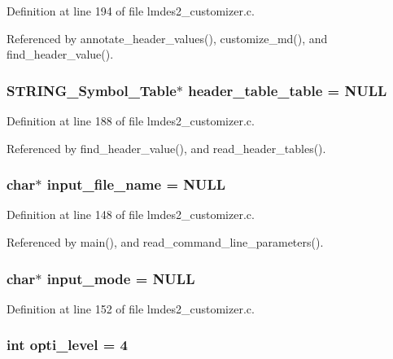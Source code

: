Definition at line 194 of file lmdes2\_\-customizer.c.

Referenced by annotate\_\-header\_\-values(), customize\_\-md(), and find\_\-header\_\-value().
\subsubsection{\setlength{\rightskip}{0pt plus 5cm}\bf{STRING\_\-Symbol\_\-Table}$\ast$ \bf{header\_\-table\_\-table} = \bf{NULL}}\label{lmdes2__customizer_8c_f225bb0e4137fd9f5fc16ee72bfbd988}




Definition at line 188 of file lmdes2\_\-customizer.c.

Referenced by find\_\-header\_\-value(), and read\_\-header\_\-tables().
\subsubsection{\setlength{\rightskip}{0pt plus 5cm}char$\ast$ \bf{input\_\-file\_\-name} = \bf{NULL}}\label{lmdes2__customizer_8c_a91ff4ee3ee60baee9c097d4da3e3d18}




Definition at line 148 of file lmdes2\_\-customizer.c.

Referenced by main(), and read\_\-command\_\-line\_\-parameters().
\subsubsection{\setlength{\rightskip}{0pt plus 5cm}char$\ast$ \bf{input\_\-mode} = \bf{NULL}}\label{lmdes2__customizer_8c_f81839da89e889adb517d1fc96a456f9}




Definition at line 152 of file lmdes2\_\-customizer.c.
\subsubsection{\setlength{\rightskip}{0pt plus 5cm}int \bf{opti\_\-level} = 4}\label{lmdes2__customizer_8c_20ad8b535e62b1a107e319b7d900a640}




